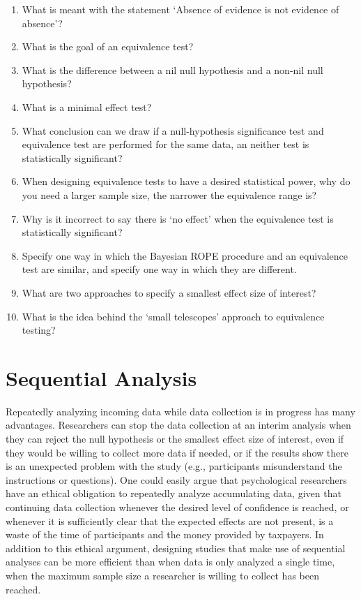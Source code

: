 \documentclass[
  oneside]{book}
\begin{document}
\begin{enumerate}
\def\labelenumi{\arabic{enumi}.}
\item
  What is meant with the statement `Absence of evidence is not evidence of absence'?
\item
  What is the goal of an equivalence test?
\item
  What is the difference between a nil null hypothesis and a non-nil null hypothesis?
\item
  What is a minimal effect test?
\item
  What conclusion can we draw if a null-hypothesis significance test and equivalence test
  are performed for the same data, an neither test is statistically significant?
\item
  When designing equivalence tests to have a desired statistical power, why do you need a
  larger sample size, the narrower the equivalence range is?
\item
  Why is it incorrect to say there is `no effect' when the equivalence test is statistically significant?
\item
  Specify one way in which the Bayesian ROPE procedure and an equivalence test are similar, and specify one way in which they are different.
\item
  What are two approaches to specify a smallest effect size of interest?
\item
  What is the idea behind the `small telescopes' approach to equivalence testing?
\end{enumerate}

\hypertarget{sequential}{%
\chapter{Sequential Analysis}\label{sequential}}

Repeatedly analyzing incoming data while data collection is in progress has many advantages. Researchers can stop the data collection at an interim analysis when they can reject the null hypothesis or the smallest effect size of interest, even if they would be willing to collect more data if needed, or if the results show there is an unexpected problem with the study (e.g., participants misunderstand the instructions or questions). One could easily argue that psychological researchers have an ethical obligation to repeatedly analyze accumulating data, given that continuing data collection whenever the desired level of confidence is reached, or whenever it is sufficiently clear that the expected effects are not present, is a waste of the time of participants and the money provided by taxpayers. In addition to this ethical argument, designing studies that make use of sequential analyses can be more efficient than when data is only analyzed a single time, when the maximum sample size a researcher is willing to collect has been reached.
\end{document}
